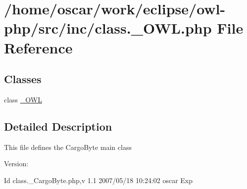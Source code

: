 \hypertarget{class_8__OWL_8php}{
\section{/home/oscar/work/eclipse/owl-php/src/inc/class.\_\-OWL.php File Reference}
\label{class_8__OWL_8php}
}
\subsection*{Classes}
\begin{CompactItemize}
\item 
class \hyperlink{class__OWL}{\_\-OWL}
\end{CompactItemize}


\subsection{Detailed Description}
This file defines the CargoByte main class \begin{Desc}
\item[Version:]\end{Desc}
\begin{Desc}
\item[Id]class.\_\-CargoByte.php,v 1.1 2007/05/18 10:24:02 oscar Exp \end{Desc}
